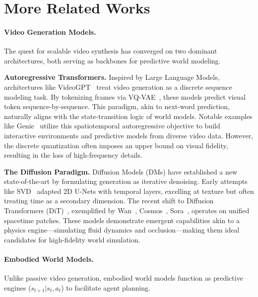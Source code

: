 \clearpage
\setcounter{page}{1}
\maketitlesupplementary

\section{More Related Works}
\label{sec:more_related_work}


\paragraph{Video Generation Models.}
The quest for scalable video synthesis has converged on two dominant architectures, both serving as backbones for predictive world modeling.

\textbf{Autoregressive Transformers.} 
Inspired by Large Language Models, architectures like VideoGPT~\cite{yan2021videogpt} treat video generation as a discrete sequence modeling task. By tokenizing frames via VQ-VAE~\cite{van2017neural}, these models predict visual token sequence-by-sequence. This paradigm, akin to next-word prediction, naturally aligns with the state-transition logic of world models. Notable examples like Genie~\cite{bruce2024genie} utilize this spatiotemporal autoregressive objective to build interactive environments and predictive models from diverse video data. However, the discrete quantization often imposes an upper bound on visual fidelity, resulting in the loss of high-frequency details.

\textbf{The Diffusion Paradigm.} 
Diffusion Models (DMs) have established a new state-of-the-art by formulating generation as iterative denoising. Early attempts like SVD~\cite{blattmann2023stable} adapted 2D U-Nets with temporal layers, excelling at texture but often treating time as a secondary dimension. The recent shift to Diffusion Transformers (DiT)~\cite{peebles2023scalable}, exemplified by Wan~\cite{wan2025wan}, Cosmos~\cite{cosmos2}, Sora~\cite{sora2024}, operates on unified spacetime patches. These models demonstrate emergent capabilities akin to a physics engine—simulating fluid dynamics and occlusion—making them ideal candidates for high-fidelity world simulation.


\paragraph{Embodied World Models.}
Unlike passive video generation, embodied world models function as predictive engines ($s_{t+1} | s_t, a_t$) to facilitate agent planning.

